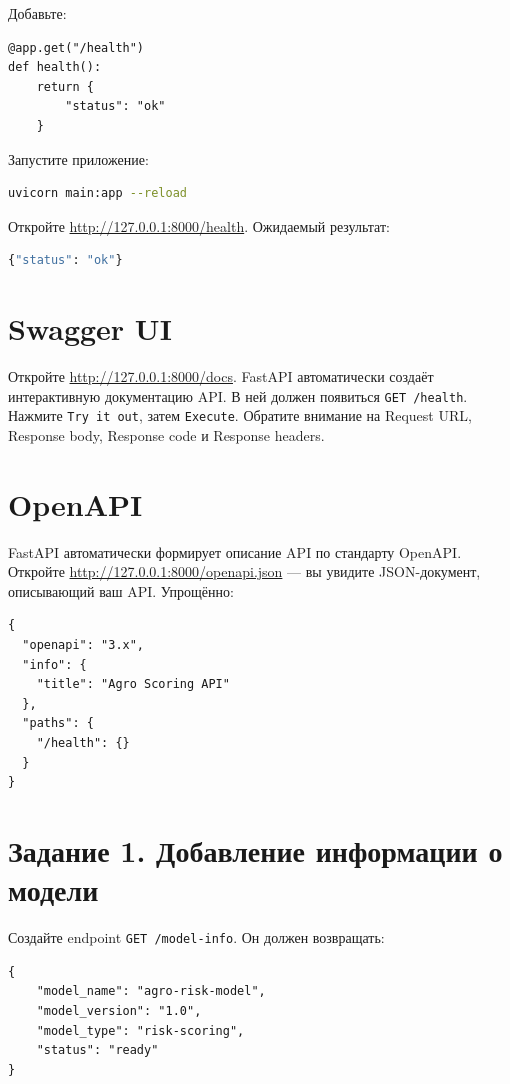 \documentclass[12pt,a4paper]{article}
\begin{document}
Добавьте:

\begin{lstlisting}[caption={Endpoint /health}]
@app.get("/health")
def health():
    return {
        "status": "ok"
    }
\end{lstlisting}

Запустите приложение:

\begin{lstlisting}[language=bash]
uvicorn main:app --reload
\end{lstlisting}

Откройте \url{http://127.0.0.1:8000/health}. Ожидаемый результат:

\begin{lstlisting}[language=Python]
{"status": "ok"}
\end{lstlisting}

\section{Swagger UI}

Откройте \url{http://127.0.0.1:8000/docs}. FastAPI автоматически создаёт интерактивную документацию API. В ней должен появиться \texttt{GET /health}. Нажмите \texttt{Try it out}, затем \texttt{Execute}. Обратите внимание на Request URL, Response body, Response code и Response headers.

\section{OpenAPI}

FastAPI автоматически формирует описание API по стандарту OpenAPI. Откройте \url{http://127.0.0.1:8000/openapi.json} — вы увидите JSON-документ, описывающий ваш API. Упрощённо:

\begin{lstlisting}[caption={Фрагмент OpenAPI-спецификации}]
{
  "openapi": "3.x",
  "info": {
    "title": "Agro Scoring API"
  },
  "paths": {
    "/health": {}
  }
}
\end{lstlisting}

\section{Задание 1. Добавление информации о модели}

Создайте endpoint \texttt{GET /model-info}. Он должен возвращать:

\begin{lstlisting}[caption={Ответ /model-info}]
{
    "model_name": "agro-risk-model",
    "model_version": "1.0",
    "model_type": "risk-scoring",
    "status": "ready"
}
\end{lstlisting}
\end{document}
